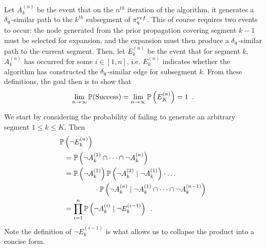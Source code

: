 Let $A_k^{(n)}$ be the event that on the $n^{th}$ iteration of the algorithm, it generates a $\delta_q$-similar path to the $k^{th}$ subsegment of $\pi_{q}^{ref}$.  This of course requires two events to occur: the node generated from the prior propagation covering segment $k-1$ must be selected for expansion, and the expansion must then produce a $\delta_q$-similar path to the current segment.  Then, let $E_k^{(n)}$ be the event that for segment $k$, $A_k^{(n)}$ has occurred for some $i \in [1,n]$, i.e. $E_k^{(n)}$ indicates whether the algorithm has constructed the $\delta_q$-similar edge for subsegment $k$. From these definitions, the goal then is to show that
\begin{equation}
    \lim_{n \rightarrow \infty} \mathbb{P}(\textrm{Success}) = \lim_{n \rightarrow \infty} \mathbb{P}\left( E^{(n)}_K \right) = 1 \enspace.
    \label{eqn:initial_pr_limit}
\end{equation}

We start by considering the probability of failing to generate an arbitrary segment $1 \leq k \leq K$. Then 
\begin{equation}
\begin{split}
    \mathbb{P}&\left( \neg E^{(n)}_k \right) \\
       &= \mathbb{P}\left( \neg A^{(1)}_k \cap \dots \cap \neg A^{(n)}_k \right) \\
       &= \mathbb{P}\left( \neg A^{(1)}_k \right) \mathbb{P}\left( \neg A^{(2)}_k \mid \neg A^{(1)}_k \right) \cdot \dots \\
       &\hspace{1.5cm} \cdot \mathbb{P}\left( \neg A^{(n)}_k \mid \neg A^{(1)}_k \cap \dots \cap \neg A^{(n-1)}_k \right) \\
       &= \prod_{i=1}^n \mathbb{P}\left( \neg A^{(i)}_k \mid \neg E^{(i-1)}_k \right) \enspace .
\end{split}
\label{eqn:fail_enk}
\end{equation}
Note the definition of $\neg E^{(i-1)}_k$ is what allows us to collapse the product into a concise form.


